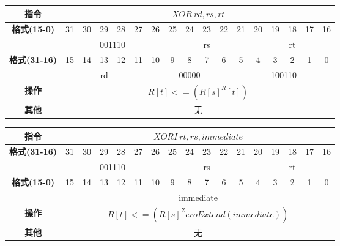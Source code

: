 \documentclass[11pt,utf8]{article}
\begin{document}
\begin{center}
\begin{tabular}{|c|c|c|c|c|c|c|c|c|c|c|c|c|c|c|c|c|}
\hline
\textbf{指令} & \multicolumn{16}{c|}{$XOR~rd, rs, rt$} \\
\hline
\multirow{2}{*}{\textbf{格式(15-0)}} & 31 & 30 & 29 & 28 & 27 & 26 & 25 & 24 & 23 & 22 & 21 & 20 & 19 & 18 & 17 & 16 \\ 
\cline{2-17}
& \multicolumn{6}{c|}{001110} & \multicolumn{5}{c|}{rs} & \multicolumn{5}{c|}{rt}\\
\hline
\multirow{2}{*}{\textbf{格式(31-16)}} & 15 & 14 & 13 & 12 & 11 & 10 & 9 & 8 & 7 & 6 & 5 & 4 & 3 & 2 & 1 & 0 \\
\cline{2-17}
& \multicolumn{5}{c|}{rd} & \multicolumn{5}{c|}{00000} & \multicolumn{6}{c|}{100110}\\
\hline
\textbf{操作} & \multicolumn{16}{c|}{$R[t]<=(R[s] ^ R[t])$} \\
\hline
\textbf{其他} & \multicolumn{16}{c|}{无} \\
\hline
\end{tabular}
\end{center}

\begin{center}
\begin{tabular}{|c|c|c|c|c|c|c|c|c|c|c|c|c|c|c|c|c|}
\hline
\textbf{指令} & \multicolumn{16}{c|}{$XORI~rt,rs,immediate$} \\
\hline
\multirow{2}{*}{\textbf{格式(31-16)}} & 31 & 30 & 29 & 28 & 27 & 26 & 25 & 24 & 23 & 22 & 21 & 20 & 19 & 18 & 17 & 16 \\ 
\cline{2-17}
& \multicolumn{6}{c|}{001110} & \multicolumn{5}{c|}{rs} & \multicolumn{5}{c|}{rt}\\
\hline
\multirow{2}{*}{\textbf{格式(15-0)}} & 15 & 14 & 13 & 12 & 11 & 10 & 9 & 8 & 7 & 6 & 5 & 4 & 3 & 2 & 1 & 0 \\
\cline{2-17}
& \multicolumn{16}{c|}{immediate}\\
\hline
\textbf{操作} & \multicolumn{16}{c|}{$R[t]<=(R[s] ^ ZeroExtend(immediate))$} \\
\hline
\textbf{其他} & \multicolumn{16}{c|}{无} \\
\hline
\end{tabular}
\end{center}
\end{document}
